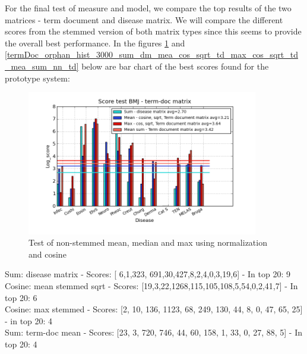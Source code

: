 For the final test of measure and model, we compare the top results of the two matrices - term document and disease matrix. We will compare the different scores from the stemmed version of both matrix types since this seems to provide the overall best performance. In the figures \ref{termDoc_bmj_hist_3000_sum_dm_mea_cos_sqrt_td_max_cos_sqrt_td_mea_sum_td} and \ref{termDoc_orphan_hist_3000_sum_dm_mea_cos_sqrt_td_max_cos_sqrt_td_mea_sum_nn_td} below are bar chart of the best scores found for the prototype system:

\begin{figure}[h!]
        \begin{center}
          \includegraphics[width=0.9\textwidth]{barcharts/termDoc_bmj_hist_3000_sum_dm_mea_cos_sqrt_td_max_cos_sqrt_td_mea_sum_td.png}
        \end{center}
        \caption{Test of non-stemmed mean, median and max using normalization and cosine}
        \label{termDoc_bmj_hist_3000_sum_dm_mea_cos_sqrt_td_max_cos_sqrt_td_mea_sum_td}
\end{figure}
 
Sum: disease matrix - Scores: [ 6,1,323, 691,30,427,8,2,4,0,3,19,6] - In top 20: 9 \\
Cosine: mean stemmed sqrt - Scores: [19,3,22,1268,115,105,108,5,54,0,2,41,7] - In top 20: 6 \\
Cosine: max stemmed - Scores: [2, 10, 136, 1123, 68, 249, 130, 44, 8, 0, 47, 65, 25] - in top 20: 4 \\
Sum: term-doc mean - Scores: [23, 3, 720, 746, 44, 60, 158, 1, 33, 0, 27, 88, 5] - In top 20: 4 \\

